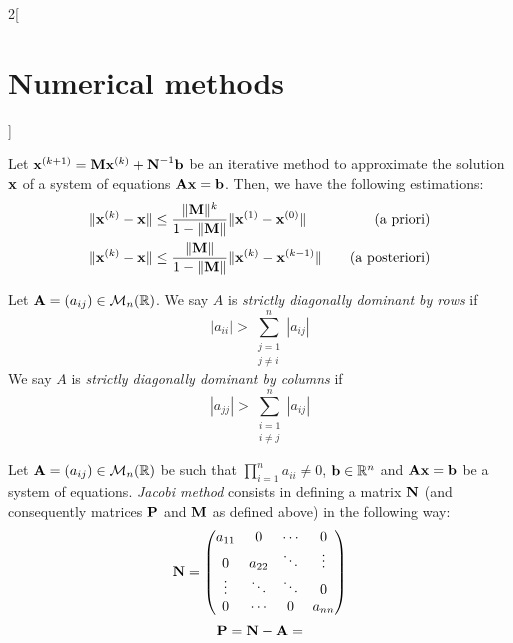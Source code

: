 \documentclass[../../../main.tex]{subfiles}
\begin{document}
\begin{multicols}{2}[\section{Numerical methods}]
\begin{prop}
    Let $\boldsymbol{\mathrm{x}}^{(k+1)}=\boldsymbol{\mathrm{M}}\boldsymbol{\mathrm{x}}^{(k)}+\boldsymbol{\mathrm{N}}^{-1}\boldsymbol{\mathrm{b}}$ be an iterative method to approximate the solution $\boldsymbol{\mathrm{x}}$ of a system of equations $\boldsymbol{\mathrm{A}}\boldsymbol{\mathrm{x}}=\boldsymbol{\mathrm{b}}$. Then, we have the following estimations:
    \begin{align*}
      \|\boldsymbol{\mathrm{x}}^{(k)}-\boldsymbol{\mathrm{x}}\| & \leq\frac{\|\boldsymbol{\mathrm{M}}\|^k}{1-\|\boldsymbol{\mathrm{M}}\|}\|\boldsymbol{\mathrm{x}}^{(1)}-\boldsymbol{\mathrm{x}}^{(0)}\|\quad & \text{(a priori)}     \\
      \|\boldsymbol{\mathrm{x}}^{(k)}-\boldsymbol{\mathrm{x}}\| & \leq\frac{\|\boldsymbol{\mathrm{M}}\|}{1-\|\boldsymbol{\mathrm{M}}\|}\|\boldsymbol{\mathrm{x}}^{(k)}-\boldsymbol{\mathrm{x}}^{(k-1)}\|\quad & \text{(a posteriori)}
    \end{align*}
  \end{prop}
  \begin{definition}
    Let $\boldsymbol{\mathrm{A}}=(a_{ij})\in\mathcal{M}_n(\mathbb{R})$. We say $A$ is \textit{strictly diagonally dominant by rows} if $$|a_{ii}|>\sum_{\substack{j=1\\j\ne i}}^n|a_{ij}|$$
    We say $A$ is \textit{strictly diagonally dominant by columns} if $$|a_{jj}|>\sum_{\substack{i=1\\i\ne j}}^n|a_{ij}|$$
  \end{definition}
  \begin{definition}
    Let $\boldsymbol{\mathrm{A}}=(a_{ij})\in\mathcal{M}_n(\mathbb{R})$ be such that $\prod_{i=1}^na_{ii}\ne 0$, $\boldsymbol{\mathrm{b}}\in\mathbb{R}^n$ and $\boldsymbol{\mathrm{A}}\boldsymbol{\mathrm{x}}=\boldsymbol{\mathrm{b}}$ be a system of equations. \textit{Jacobi method} consists in defining a matrix $\boldsymbol{\mathrm{N}}$ (and consequently matrices $\boldsymbol{\mathrm{P}}$ and $\boldsymbol{\mathrm{M}}$ as defined above) in the following way:
    \begin{equation*}
      \boldsymbol{\mathrm{N}}=
      \begin{pmatrix}
        a_{11} & 0      & \cdots & 0      \\
        0      & a_{22} & \ddots & \vdots \\
        \vdots & \ddots & \ddots & 0      \\
        0      & \cdots & 0      & a_{nn}
      \end{pmatrix}
    \end{equation*}
    \begin{equation*}
      \vectorfunction{P}=\vectorfunction{N}-\vectorfunction{A}=

\end{equation*}
\end{definition}
\end{multicols}
\end{document}

